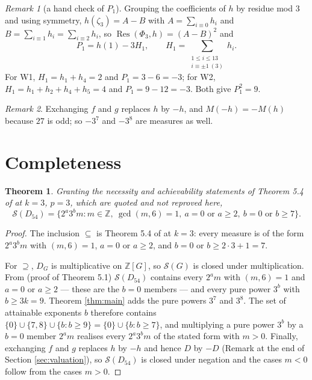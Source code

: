 \documentclass[11pt]{amsart}
\newtheorem{theorem}{Theorem}
\theoremstyle{remark}
\newtheorem*{remark}{Remark}
\DeclareMathOperator{\Res}{Res}
\newcommand{\ZZ}{\mathbb Z}
\newcommand{\Sset}{\mathcal S}
\begin{document}
\begin{remark}[a hand check of $P_1$]
Grouping the coefficients of $h$ by residue mod $3$ and using symmetry,
$h(\zeta_3)=A-B$ with $A=\sum_{i\equiv0}h_i$ and
$B=\sum_{i\equiv1}h_i=\sum_{i\equiv2}h_i$, so
$\Res(\Phi_3,h)=(A-B)^2$ and
\[
 P_1=h(1)-3H_1,\qquad
 H_1=\sum_{\substack{1\le i\le13\\ i\equiv\pm1\ (3)}}h_i .
\]
For W1, $H_1=h_1+h_4=2$ and $P_1=3-6=-3$; for W2,
$H_1=h_1+h_2+h_4+h_5=4$ and $P_1=9-12=-3$. Both give $P_1^2=9$.
\end{remark}

\begin{remark}
Exchanging $f$ and $g$ replaces $h$ by $-h$, and $M(-h)=-M(h)$ because $27$ is
odd; so $-3^7$ and $-3^8$ are measures as well.
\end{remark}

\section{Completeness}

\begin{theorem}\label{thm:complete}
Granting the necessity and achievability statements of Theorem 5.4 of
\cite{BP} at $k=3$, $p=3$, which are quoted and not reproved here,
\[
 \Sset(D_{54})=\bigl\{2^a3^bm : m\in\ZZ,\ \gcd(m,6)=1,\ a=0\text{ or }a\ge2,\
 b=0\text{ or }b\ge7\bigr\}.
\]
\end{theorem}

\begin{proof}
The inclusion $\subseteq$ is Theorem 5.4 of \cite{BP} at $k=3$: every measure
is of the form $2^a3^bm$ with $(m,6)=1$, $a=0$ or $a\ge2$, and $b=0$ or
$b\ge2\cdot3+1=7$.

For $\supseteq$, $D_G$ is multiplicative on $\ZZ[G]$, so $\Sset(G)$ is closed
under multiplication. From \cite{BP} (proof of Theorem 5.1) $\Sset(D_{54})$
contains every $2^am$ with $(m,6)=1$ and $a=0$ or $a\ge2$ --- these are the
$b=0$ members --- and every pure power $3^b$ with $b\ge3k=9$. Theorem
\ref{thm:main} adds the pure powers $3^7$ and $3^8$. The set of attainable
exponents $b$ therefore contains $\{0\}\cup\{7,8\}\cup\{b:b\ge9\}
=\{0\}\cup\{b:b\ge7\}$, and multiplying a pure power $3^b$ by a $b=0$ member
$2^am$ realises every $2^a3^bm$ of the stated form with $m>0$. Finally,
exchanging $f$ and $g$ replaces $h$ by $-h$ and hence $D$ by $-D$ (Remark at
the
end of Section \ref{sec:valuation}), so $\Sset(D_{54})$ is closed under
negation and the cases $m<0$ follow from the cases $m>0$.
\end{proof}
\end{document}
